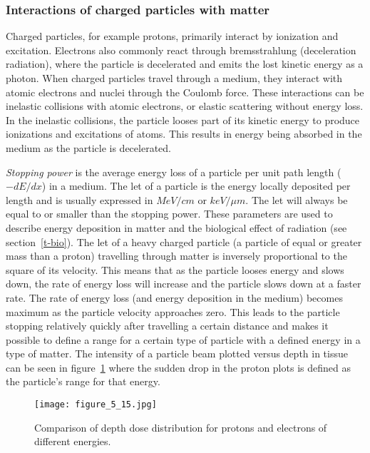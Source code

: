 \documentclass[../main/thesis.tex]{subfiles}
\begin{document}
\subsubsection{Interactions of charged particles with matter}
\label{t-cp}
Charged particles, for example protons, primarily interact by ionization and excitation. Electrons also commonly react through bremsstrahlung (deceleration radiation), where the particle is decelerated and emits the lost kinetic energy as a photon. When charged particles travel through a medium, they interact with atomic electrons and nuclei through the Coulomb force. These interactions can be inelastic collisions with atomic electrons, or elastic scattering without energy loss. In the inelastic collisions, the particle looses part of its kinetic energy to produce ionizations and excitations of atoms. This results in energy being absorbed in the medium as the particle is decelerated. \citep[chap. 5 $\&$ 27]{Khan} 

\newpage
\textit{Stopping power} is the average energy loss of a particle per unit path length ($-dE/dx$) in a medium. The \gls{let} of a particle is the energy locally deposited per length and is usually expressed in $MeV/cm$ or $keV/{\mu}m$. The \gls{let} will always be equal to or smaller than the stopping power. These parameters are used to describe energy deposition in matter and the biological effect of radiation (see section~\ref{t-bio}). The \gls{let} of a heavy charged particle (a particle of equal or greater mass than a proton) travelling through matter is inversely proportional to the square of its velocity. This means that as the particle looses energy and slows down, the rate of energy loss will increase and the particle slows down at a faster rate. The rate of energy loss (and energy deposition in the medium) becomes maximum as the particle velocity approaches zero. This leads to the particle stopping relatively quickly after travelling a certain distance and makes it possible to define a range for a certain type of particle with a defined energy in a type of matter. The intensity of a particle beam plotted versus depth in tissue can be seen in figure~\ref{fig-range} where the sudden drop in the proton plots is defined as the particle's range for that energy. \citep[chap. 27]{Khan}

\begin{figure}[h]
	\centering
	\texttt{[image: figure\_5\_15.jpg]}
	\caption{Comparison of depth dose distribution for protons and electrons of different energies. \citep[fig. 5.15]{Khan}}
	\label{fig-range}
\end{figure}
\end{document}

